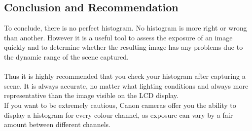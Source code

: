 \subsection{Conclusion and Recommendation}

To conclude, there is no perfect histogram. No histogram is more right or wrong than another. However it is a useful tool to assess the exposure of an image quickly and to determine whether the resulting image has any problems due to the dynamic range of the scene captured.
\\
\\
Thus it is highly recommended that you check your histogram after capturing a scene. It is always accurate, no matter what lighting conditions and always more representative than the image visible on the LCD display.
\\
If you want to be extremely cautious, Canon cameras offer you the ability to display a histogram for every colour channel, as exposure can vary by a fair amount between different channels.
